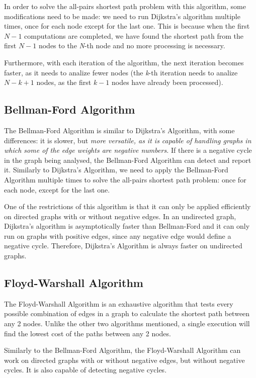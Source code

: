 \documentclass[runningheads]{llncs}
\begin{document}
In order to solve the all-pairs shortest path problem with this algorithm, some modifications need to be made: we need to run Dijkstra's algorithm multiple times, once for each node except for the last one. This is because when the first \(N - 1\) computations are completed, we have found the shortest path from the first \(N - 1\) nodes to the \textit{N}-th node and no more processing is necessary. 

Furthermore, with each iteration of the algorithm, the next iteration becomes faster, as it needs to analize fewer nodes (the \textit{k}-th iteration needs to analize \(N - k + 1\) nodes, as the first \(k - 1\) nodes have already been processed).

\subsection{Bellman-Ford Algorithm}
The Bellman-Ford Algorithm is similar to Dijkstra's Algorithm, with some differences: it is slower, but \textit{more versatile, as it is capable of handling graphs in which some of the edge weights are negative numbers.}\cite{ref_url_BF} If there is a negative cycle in the graph being analysed, the Bellman-Ford Algorithm can detect and report it. Similarly to Dijkstra's Algorithm, we need to apply the Bellman-Ford Algorithm multiple times to solve the all-pairs shortest path problem: once for each node, except for the last one.

One of the restrictions of this algorithm is that it can only be applied efficiently on directed graphs with or without negative edges. In an undirected graph, Dijkstra's algorithm is asymptotically faster than Bellman-Ford and it can only run on graphs with positive edges, since any negative edge would define a negative cycle. Therefore, Dijkstra's Algorithm is always faster on undirected graphs.

\subsection{Floyd-Warshall Algorithm}
The Floyd-Warshall Algorithm is an exhaustive algorithm that tests every possible combination of edges in a graph to calculate the shortest path between any 2 nodes. Unlike the other two algorithms mentioned, a single execution will find the lowest cost of the paths between any 2 nodes.

Similarly to the Bellman-Ford Algorithm, the Floyd-Warshall Algorithm can work on directed graphs with or without negative edges, but without negative cycles. It is also capable of detecting negative cycles.
\end{document}
